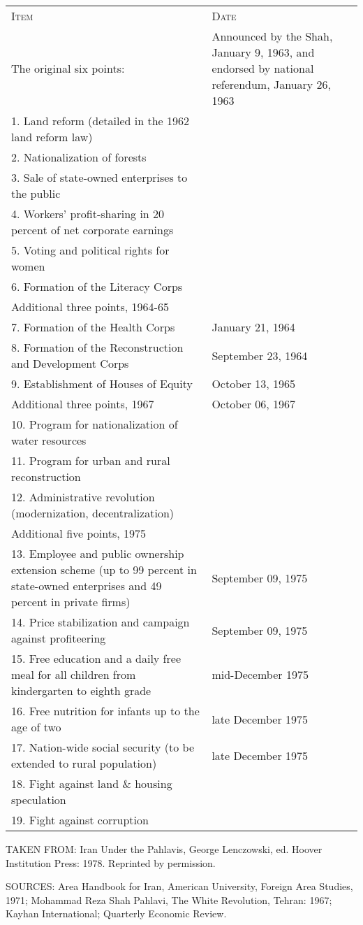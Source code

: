 \begin{longtable}{p{16em}p{16em}}
    \textsc{Item}  & {\textsc{Date}} \\
    The original six points: & {{Announced by the Shah, January 9, 1963, and endorsed by national referendum, January 26, 1963}} \\
    1. Land reform (detailed in the 1962 land reform law) &  \\
    2. Nationalization of forests &  \\
    3. Sale of state-owned enterprises to the public &  \\
    4. Workers’ profit-sharing in 20 percent of net corporate earnings &  \\
    5. Voting and political rights for women &  \\
    6. Formation of the Literacy Corps &  \\
    Additional three points, 1964-65 &  \\
    7. Formation of the Health Corps & January 21, 1964 \\
    8. Formation of the Reconstruction and Development Corps & September 23, 1964 \\
    9. Establishment of Houses of Equity & October 13, 1965 \\
    Additional three points, 1967 & October 06, 1967 \\
    10. Program for nationalization of water resources &  \\
    11. Program for urban and rural reconstruction &  \\
    12. Administrative revolution (modernization, decentralization) &  \\
    Additional five points, 1975 &  \\
    13. Employee and public ownership extension scheme (up to 99 percent in state-owned enterprises and 49 percent in private firms) & September 09, 1975 \\
    14. Price stabilization and campaign against profiteering & September 09, 1975 \\
    15. Free education and a daily free meal for all children from kindergarten to eighth grade & \multicolumn{1}{p{11.715em}}{mid-December 1975} \\
    16. Free nutrition for infants up to the age of two & {late December 1975} \\
    17. Nation-wide social security (to be extended to rural population) & {late December 1975} \\
    18. Fight against land \& housing speculation &  \\
    19. Fight against corruption &  \\
    \end{longtable}%


TAKEN FROM: Iran Under the Pahlavis, George Lenczowski, ed. Hoover Institution Press: 1978. Reprinted by permission. 

SOURCES: Area Handbook for Iran, American University, Foreign Area Studies, 1971; Mohammad Reza Shah Pahlavi, The White Revolution, Tehran: 1967; Kayhan International; Quarterly Economic Review. 

